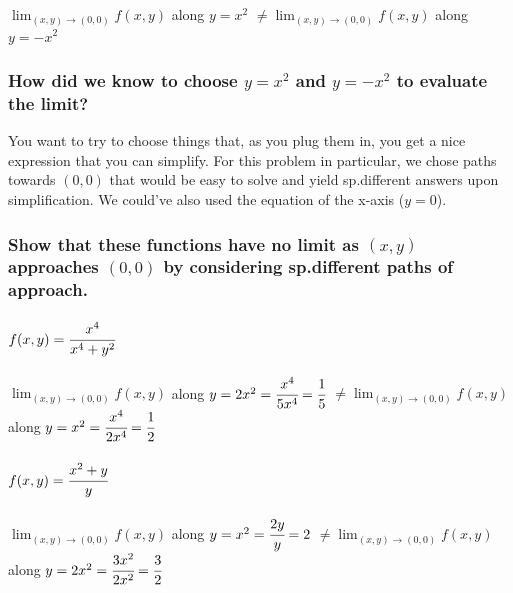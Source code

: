 \documentclass[
  letterpaper,
  DIV=11,
  numbers=noendperiod]{scrartcl}
\let\oldparagraph\paragraph
\renewcommand{\paragraph}[1]{\oldparagraph{#1}\mbox{}}
\begin{document}
\(\lim_{(x,y) \rightarrow(0,0)}f(x,y)\) along \(y=x^2\)
\(\ne \lim_{(x, y)\rightarrow(0, 0)}f(x, y)\) along \(y=-x^2\)

\subsubsection{\texorpdfstring{How did we know to choose \(y=x^2\) and
\(y=-x^2\) to evaluate the
limit?}{How did we know to choose y=x\^{}2 and y=-x\^{}2 to evaluate the limit?}}\label{how-did-we-know-to-choose-yx2-and-y-x2-to-evaluate-the-limit}

You want to try to choose things that, as you plug them in, you get a
nice expression that you can simplify. For this problem in particular,
we chose paths towards \((0, 0)\) that would be easy to solve and yield
sp.different answers upon simplification. We could've also used the
equation of the x-axis (\(y=0\)).

\subsubsection{\texorpdfstring{Show that these functions have no limit
as \((x, y)\) approaches \((0, 0)\) by considering sp.different paths of
approach.}{Show that these functions have no limit as (x, y) approaches (0, 0) by considering sp.different paths of approach.}}\label{show-that-these-functions-have-no-limit-as-x-y-approaches-0-0-by-considering-sp.different-paths-of-approach.}

\paragraph{\texorpdfstring{\(f(x,y) = \cfrac{x^4}{x^4+y^2}\)}{f(x,y) = \textbackslash cfrac\{x\^{}4\}\{x\^{}4+y\^{}2\}}}\label{fxy-cfracx4x4y2}

\(\lim_{(x, y)\rightarrow(0, 0)} f(x, y)\) along
\(y=2x^2 = \cfrac{x^4}{5x^4}=\cfrac{1}{5}\)
\(\ne \lim_{(x, y)\rightarrow(0, 0)} f(x, y)\) along
\(y=x^2 = \cfrac{x^4}{2x^4} = \cfrac{1}{2}\)

\paragraph{\texorpdfstring{\(f(x, y) = \cfrac{x^2+y}{y}\)}{f(x, y) = \textbackslash cfrac\{x\^{}2+y\}\{y\}}}\label{fx-y-cfracx2yy}

\(\lim_{(x, y)\rightarrow(0,0)} f(x, y)\) along
\(y=x^2 = \cfrac{2y}{y} = 2\)
\(\ne \lim_{(x, y)\rightarrow(0,0)} f(x, y)\) along
\(y=2x^2 = \cfrac{3x^2}{2x^2} = \cfrac{3}{2}\)
\end{document}
